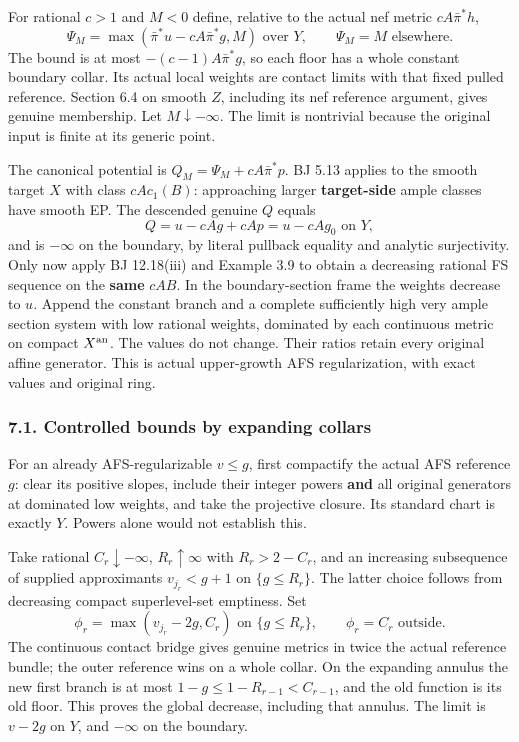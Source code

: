 \documentclass[
  10pt,
]{article}
\begin{document}
For rational \(c>1\) and \(M<0\) define, relative to the actual nef
metric \(cA\bar\pi^*h\),
\[\Psi_M=\max(\bar\pi^*u-cA\bar\pi^*g,M)\text{ over }Y,
\qquad\Psi_M=M\text{ elsewhere}. \tag{7.1}\] The bound is at most
\(-(c-1)A\bar\pi^*g\), so each floor has a whole constant boundary
collar. Its actual local weights are contact limits with that fixed
pulled reference. Section 6.4 on smooth \(Z\), including its nef
reference argument, gives genuine membership. Let
\(M\downarrow-\infty\). The limit is nontrivial because the original
input is finite at its generic point.

The canonical potential is \(Q_M=\Psi_M+cA\bar\pi^*p\). BJ 5.13 applies
to the smooth target \(X\) with class \(cA c_1(B)\): approaching larger
\textbf{target-side} ample classes have smooth EP. The descended genuine
\(Q\) equals \[Q=u-cAg+cAp=u-cAg_0\text{ on }Y,\] and is \(-\infty\) on
the boundary, by literal pullback equality and analytic surjectivity.
Only now apply BJ 12.18(iii) and Example 3.9 to obtain a decreasing
rational FS sequence on the \textbf{same} \(cAB\). In the
boundary-section frame the weights decrease to \(u\). Append the
constant branch and a complete sufficiently high very ample section
system with low rational weights, dominated by each continuous metric on
compact \(X^{\rm an}\). The values do not change. Their ratios retain
every original affine generator. This is actual upper-growth AFS
regularization, with exact values and original ring.

\subsubsection{7.1. Controlled bounds by expanding
collars}\label{controlled-bounds-by-expanding-collars}

For an already AFS-regularizable \(v\le g\), first compactify the actual
AFS reference \(g\): clear its positive slopes, include their integer
powers \textbf{and} all original generators at dominated low weights,
and take the projective closure. Its standard chart is exactly \(Y\).
Powers alone would not establish this.

Take rational \(C_r\downarrow-\infty\), \(R_r\uparrow\infty\) with
\(R_r>2-C_r\), and an increasing subsequence of supplied approximants
\(v_{j_r}<g+1\) on \(\{g\le R_r\}\). The latter choice follows from
decreasing compact superlevel-set emptiness. Set
\[\phi_r=\max(v_{j_r}-2g,C_r)\text{ on }\{g\le R_r\},\qquad
\phi_r=C_r\text{ outside}. \tag{7.2}\] The continuous contact bridge
gives genuine metrics in twice the actual reference bundle; the outer
reference wins on a whole collar. On the expanding annulus the new first
branch is at most \(1-g\le1-R_{r-1}<C_{r-1}\), and the old function is
its old floor. This proves the global decrease, including that annulus.
The limit is \(v-2g\) on \(Y\), and \(-\infty\) on the boundary.
\end{document}
